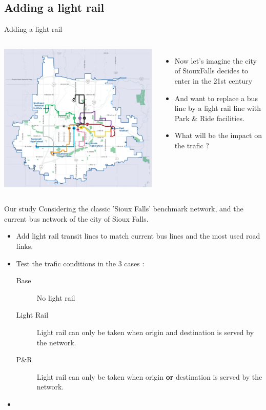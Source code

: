 \documentclass{EESD}
\begin{document}
\subsection{Adding a light rail}
\begin{frame}{Adding a light rail}
	\begin{columns}
	\includegraphics[width = \linewidth]{siouxfalls_bus_network.png}
	\begin{itemize}
		\item Now let's imagine the city of SiouxFalls decides to enter in the 21st century
		\item And want to replace a bus line by a light rail line with Park \& Ride facilities.
		\item What will be the impact on the trafic ?
	\end{itemize}
	\end{columns}
\end{frame}

\begin{frame}{Our study}
	Considering the classic 'Sioux Falls' benchmark network, and the current bus network of the city of Sioux Falls.
	\begin{itemize}
		\item[\textrightarrow] Add light rail transit lines to match current bus lines and the most used road links.
		\item[\textrightarrow] Test the trafic conditions in the 3 cases : \begin{description}
			\item[Base] No light rail
			\item[Light Rail] Light rail can only be taken when origin and destination is served by the network.
			\item[P\&R] Light rail can only be taken when origin \textbf{or} destination is served by the network.
		\end{description}
		\item[] 
	\end{itemize}
\end{frame}
\end{document}
